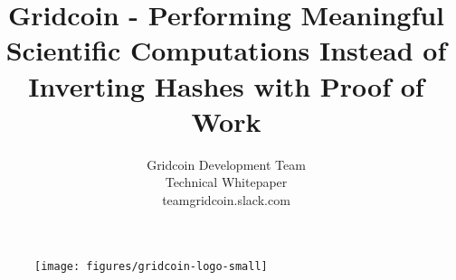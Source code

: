 \documentclass[10pt,a4paper]{article}
\begin{document}
\pagestyle{headings}


\begin{figure}
\centering
\texttt{[image: figures/gridcoin-logo-small]}
\end{figure}


\title{Gridcoin - Performing Meaningful Scientific Computations Instead of Inverting Hashes with Proof of Work}

\author{Gridcoin Development Team\\
Technical Whitepaper\\
teamgridcoin.slack.com\\}


\maketitle



\pagebreak

\tableofcontents

\pagebreak



\pagebreak





\pagebreak



\pagebreak

















\newpage



\pagebreak




\end{document}
